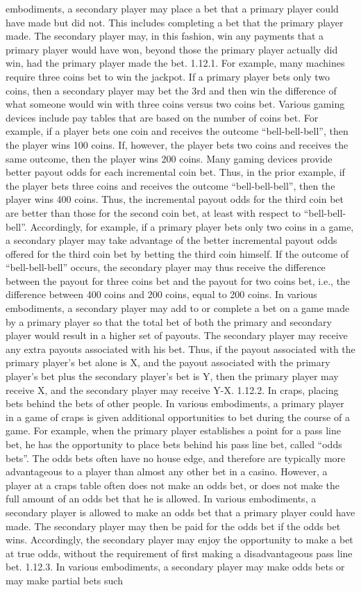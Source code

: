 \documentclass[11pt,a4paper]{article}
\begin{document}
embodiments, a secondary player may place a bet that a primary player could have made but did not. This includes completing a bet that the primary player made. The secondary player may, in this fashion, win any payments that a primary player would have won, beyond those the primary player actually did win, had the primary player made the bet. 1.12.1. For example, many machines require three coins bet to win the jackpot. If a primary player bets only two coins, then a secondary player may bet the 3rd and then win the difference of what someone would win with three coins versus two coins bet. Various gaming devices include pay tables that are based on the number of coins bet. For example, if a player bets one coin and receives the outcome “bell-bell-bell”, then the player wins 100 coins. If, however, the player bets two coins and receives the same outcome, then the player wins 200 coins. Many gaming devices provide better payout odds for each incremental coin bet. Thus, in the prior example, if the player bets three coins and receives the outcome “bell-bell-bell”, then the player wins 400 coins. Thus, the incremental payout odds for the third coin bet are better than those for the second coin bet, at least with respect to “bell-bell-bell”. Accordingly, for example, if a primary player bets only two coins in a game, a secondary player may take advantage of the better incremental payout odds offered for the third coin bet by betting the third coin himself. If the outcome of “bell-bell-bell” occurs, the secondary player may thus receive the difference between the payout for three coins bet and the payout for two coins bet, i.e., the difference between 400 coins and 200 coins, equal to 200 coins. In various embodiments, a secondary player may add to or complete a bet on a game made by a primary player so that the total bet of both the primary and secondary player would result in a higher set of payouts. The secondary player may receive any extra payouts associated with his bet. Thus, if the payout associated with the primary player's bet alone is X, and the payout associated with the primary player's bet plus the secondary player's bet is Y, then the primary player may receive X, and the secondary player may receive Y-X. 1.12.2. In craps, placing bets behind the bets of other people. In various embodiments, a primary player in a game of craps is given additional opportunities to bet during the course of a game. For example, when the primary player establishes a point for a pass line bet, he has the opportunity to place bets behind his pass line bet, called “odds bets”. The odds bets often have no house edge, and therefore are typically more advantageous to a player than almost any other bet in a casino. However, a player at a craps table often does not make an odds bet, or does not make the full amount of an odds bet that he is allowed. In various embodiments, a secondary player is allowed to make an odds bet that a primary player could have made. The secondary player may then be paid for the odds bet if the odds bet wins. Accordingly, the secondary player may enjoy the opportunity to make a bet at true odds, without the requirement of first making a disadvantageous pass line bet. 1.12.3. In various embodiments, a secondary player may make odds bets or may make partial bets such 
\end{document}

